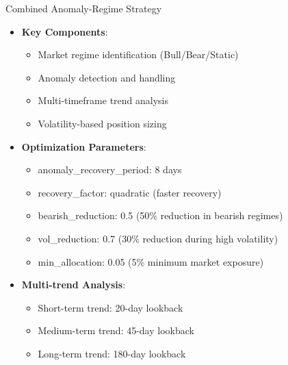 \documentclass[aspectratio=169,xcolor=dvipsnames]{beamer}
\begin{document}
\begin{frame}{Combined Anomaly-Regime Strategy}
	\begin{itemize}
		\item \textbf{Key Components}:
		      \begin{itemize}
			      \item Market regime identification (Bull/Bear/Static)
			      \item Anomaly detection and handling
			      \item Multi-timeframe trend analysis
			      \item Volatility-based position sizing
		      \end{itemize}
		\item \textbf{Optimization Parameters}:
		      \begin{itemize}
			      \item anomaly\_recovery\_period: 8 days
			      \item recovery\_factor: quadratic (faster recovery)
			      \item bearish\_reduction: 0.5 (50\% reduction in bearish regimes)
			      \item vol\_reduction: 0.7 (30\% reduction during high volatility)
			      \item min\_allocation: 0.05 (5\% minimum market exposure)
		      \end{itemize}
		\item \textbf{Multi-trend Analysis}:
		      \begin{itemize}
			      \item Short-term trend: 20-day lookback
			      \item Medium-term trend: 45-day lookback
			      \item Long-term trend: 180-day lookback
		      \end{itemize}
	\end{itemize}
\end{frame}
\end{document}
